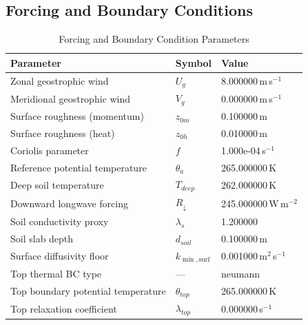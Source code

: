 \subsection{Forcing and Boundary Conditions}
\begin{table}[htbp]
\centering
\caption{Forcing and Boundary Condition Parameters}
\label{tab:scm_parameters_gabls1_gabls1_200x2m_12h_report}
\begin{tabular}{lll}
\hline
{\bfseries Parameter} & {\bfseries Symbol} & {\bfseries Value} \\
\hline
Zonal geostrophic wind & $U_g$ & 8.000000\,m\,s$^{-1}$ \\
Meridional geostrophic wind & $V_g$ & 0.000000\,m\,s$^{-1}$ \\
Surface roughness (momentum) & $z_{0m}$ & 0.100000\,m \\
Surface roughness (heat) & $z_{0h}$ & 0.010000\,m \\
Coriolis parameter & $f$ & 1.000e-04\,s$^{-1}$ \\
Reference potential temperature & $\theta_a$ & 265.000000\,K \\
Deep soil temperature & $T_{deep}$ & 262.000000\,K \\
Downward longwave forcing & $R_{\downarrow}$ & 245.000000\,W\,m$^{-2}$ \\
Soil conductivity proxy & $\lambda_s$ & 1.200000 \\
Soil slab depth & $d_{soil}$ & 0.100000\,m \\
Surface diffusivity floor & $k_{\min,\mathrm{surf}}$ & 0.001000\,m$^2$\,s$^{-1}$ \\
Top thermal BC type & --- & neumann \\
Top boundary potential temperature & $\theta_{top}$ & 265.000000\,K \\
Top relaxation coefficient & $\lambda_{top}$ & 0.000000\,s$^{-1}$ \\
\hline
\end{tabular}
\end{table}

